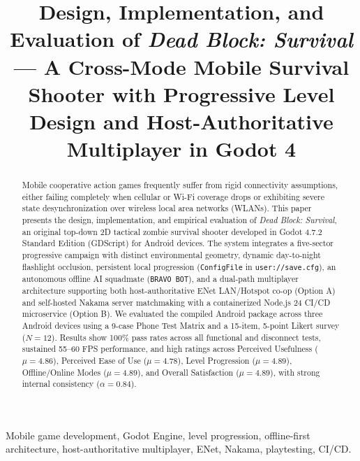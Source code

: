 \documentclass[conference]{IEEEtran}
\begin{document}
\title{Design, Implementation, and Evaluation of \textit{Dead Block: Survival} --- A Cross-Mode Mobile Survival Shooter with Progressive Level Design and Host-Authoritative Multiplayer in Godot 4}

\author{
}

\maketitle

\begin{abstract}
Mobile cooperative action games frequently suffer from rigid connectivity assumptions, either failing completely when cellular or Wi-Fi coverage drops or exhibiting severe state desynchronization over wireless local area networks (WLANs). This paper presents the design, implementation, and empirical evaluation of \textit{Dead Block: Survival}, an original top-down 2D tactical zombie survival shooter developed in Godot 4.7.2 Standard Edition (GDScript) for Android devices. The system integrates a five-sector progressive campaign with distinct environmental geometry, dynamic day-to-night flashlight occlusion, persistent local progression (\texttt{ConfigFile} in \texttt{user://save.cfg}), an autonomous offline AI squadmate (\texttt{BRAVO BOT}), and a dual-path multiplayer architecture supporting both host-authoritative ENet LAN/Hotspot co-op (Option A) and self-hosted Nakama server matchmaking with a containerized Node.js 24 CI/CD microservice (Option B). We evaluated the compiled Android package across three Android devices using a 9-case Phone Test Matrix and a 15-item, 5-point Likert survey ($N = 12$). Results show 100\% pass rates across all functional and disconnect tests, sustained 55--60 FPS performance, and high ratings across Perceived Usefulness ($\mu = 4.86$), Perceived Ease of Use ($\mu = 4.78$), Level Progression ($\mu = 4.89$), Offline/Online Modes ($\mu = 4.89$), and Overall Satisfaction ($\mu = 4.89$), with strong internal consistency ($\alpha = 0.84$).
\end{abstract}

\begin{IEEEkeywords}
Mobile game development, Godot Engine, level progression, offline-first architecture, host-authoritative multiplayer, ENet, Nakama, playtesting, CI/CD.
\end{IEEEkeywords}
\end{document}
